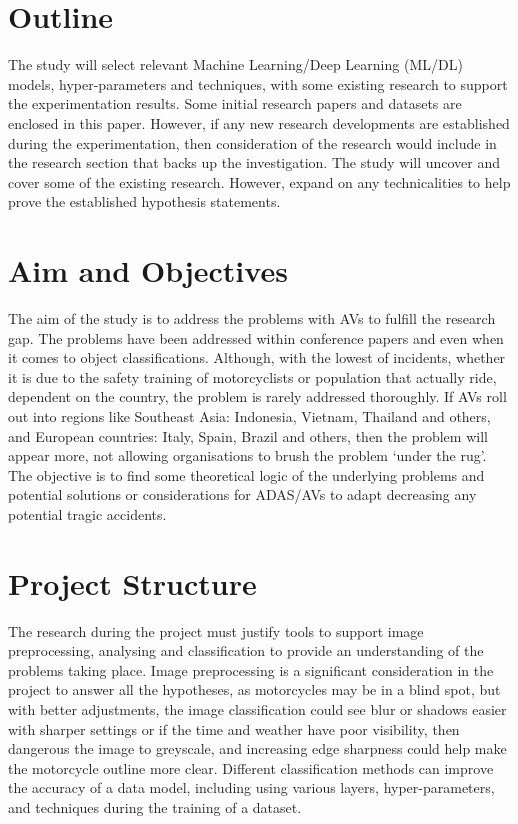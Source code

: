 \documentclass[12pt]{report} %
\begin{document}
	\section{Outline}
        The study will select relevant Machine Learning/Deep Learning (ML/DL) models, hyper-parameters and techniques, with some existing research to support the experimentation results. Some initial research papers and datasets are enclosed in this paper. However, if any new research developments are established during the experimentation, then consideration of the research would include in the research section that backs up the investigation. The study will uncover and cover some of the existing research. However, expand on any technicalities to help prove the established hypothesis statements.

	\section{Aim and Objectives}
        The aim of the study is to address the problems with AVs to fulfill the research gap. The problems have been addressed within conference papers and even when it comes to object classifications. Although, with the lowest of incidents, whether it is due to the safety training of motorcyclists or population that actually ride, dependent on the country, the problem is rarely addressed thoroughly. If AVs roll out into regions like Southeast Asia: Indonesia, Vietnam, Thailand and others, and European countries: Italy, Spain, Brazil and others, then the problem will appear more, not allowing organisations to brush the problem `under the rug'. The objective is to find some theoretical logic of the underlying problems and potential solutions or considerations for ADAS/AVs to adapt decreasing any potential tragic accidents.

	\section{Project Structure}
        The research during the project must justify tools to support image preprocessing, analysing and classification to provide an understanding of the problems taking place. Image preprocessing is a significant consideration in the project to answer all the hypotheses, as motorcycles may be in a blind spot, but with better adjustments, the image classification could see blur or shadows easier with sharper settings or if the time and weather have poor visibility, then dangerous the image to greyscale, and increasing edge sharpness could help make the motorcycle outline more clear. Different classification methods can improve the accuracy of a data model, including using various layers, hyper-parameters, and techniques during the training of a dataset.
\end{document}
